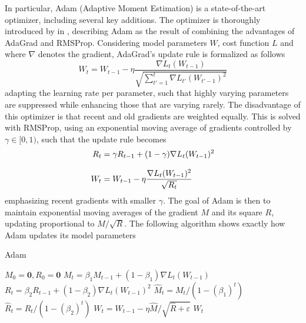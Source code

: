         In particular, Adam (Adaptive Moment Estimation) is a state-of-the-art optimizer, including several key additions. The optimizer is thoroughly introduced by \citeauthor{kingma2017adam} in \cite{kingma2017adam}, describing Adam as the result of combining the advantages of AdaGrad and RMSProp. Considering model parameters $W$, cost function $L$ and where $\nabla$ denotes the gradient, AdaGrad's update rule is formalized as follows
        \begin{equation}
            W_t = W_{t-1} - \eta \frac{\nabla L_t(W_{t-1})}{\sqrt{\sum_{t'=1}^t\nabla L_{t'}(W_{t'-1})^2}}
        \end{equation}
        adapting the learning rate per parameter, such that highly varying parameters are suppressed while enhancing those that are varying rarely. The disadvantage of this optimizer is that recent and old gradients are weighted equally. This is solved with RMSProp, using an exponential moving average of gradients controlled by $\gamma \in [0,1)$, such that the update rule becomes
        \begin{align}
            R_t &= \gamma R_{t-1}+(1-\gamma)\nabla L_t(W_{t-1})^2 \\[.5\baselineskip]
            W_t &= W_{t-1} - \eta \frac{\nabla L_t(W_{t-1})^2}{\sqrt{R_t}}
        \end{align}
        emphasizing recent gradients with smaller $\gamma$. The goal of Adam is then to maintain exponential moving averages of the gradient $M$ and its square $R$, updating proportional to $M / \sqrt{R}$. The following algorithm shows exactly how Adam updates its model parameters
        {\par\vspace{-\baselineskip}\centering
        \begin{minipage}{.6\textwidth}
            \begin{algorithm}[H]
            \caption{Adam}
            \begin{algorithmic}[1]
                \STATE $M_0 = \bm{0}, R_0 = \bm{0}$
                    \STATE $M_t = \beta_1 M_{t-1} + (1-\beta_1) \nabla L_t(W_{t-1})$
                    \STATE $R_t = \beta_2 R_{t-1} + (1-\beta_2) \nabla L_t(W_{t-1})^2$
                    \STATE $\hat{M}_t = M_t / (1-(\beta_1)^t)$
                    \STATE $\hat{R}_t = R_t / (1-(\beta_2)^t)$
                    \STATE $W_t = W_{t-1} - \eta \hat{M} \Big/ \sqrt{\hat{R}+\varepsilon}$
                \ENDFOR
                \RETURN $W_t$
            \end{algorithmic}
            \end{algorithm}
        \end{minipage}
        \par}
